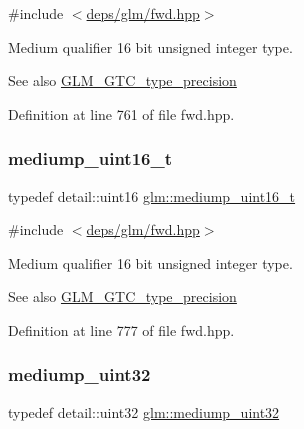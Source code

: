 {\ttfamily \#include $<$\hyperlink{fwd_8hpp}{deps/glm/fwd.\+hpp}$>$}

Medium qualifier 16 bit unsigned integer type. \begin{DoxySeeAlso}{See also}
\hyperlink{group__gtc__type__precision}{G\+L\+M\+\_\+\+G\+T\+C\+\_\+type\+\_\+precision} 
\end{DoxySeeAlso}


Definition at line 761 of file fwd.\+hpp.

\mbox{\label{group__gtc__type__precision_ga0b385466deac5ac96061ef2cdd6db20f}} 
\subsubsection{\texorpdfstring{mediump\+\_\+uint16\+\_\+t}{mediump\_uint16\_t}}
{\footnotesize\ttfamily typedef detail\+::uint16 \hyperlink{group__gtc__type__precision_ga0b385466deac5ac96061ef2cdd6db20f}{glm\+::mediump\+\_\+uint16\+\_\+t}}



{\ttfamily \#include $<$\hyperlink{fwd_8hpp}{deps/glm/fwd.\+hpp}$>$}

Medium qualifier 16 bit unsigned integer type. \begin{DoxySeeAlso}{See also}
\hyperlink{group__gtc__type__precision}{G\+L\+M\+\_\+\+G\+T\+C\+\_\+type\+\_\+precision} 
\end{DoxySeeAlso}


Definition at line 777 of file fwd.\+hpp.

\mbox{\label{group__gtc__type__precision_ga861dbd1051f488e425b3966001b568e5}} 
\subsubsection{\texorpdfstring{mediump\+\_\+uint32}{mediump\_uint32}}
{\footnotesize\ttfamily typedef detail\+::uint32 \hyperlink{group__gtc__type__precision_ga861dbd1051f488e425b3966001b568e5}{glm\+::mediump\+\_\+uint32}}



